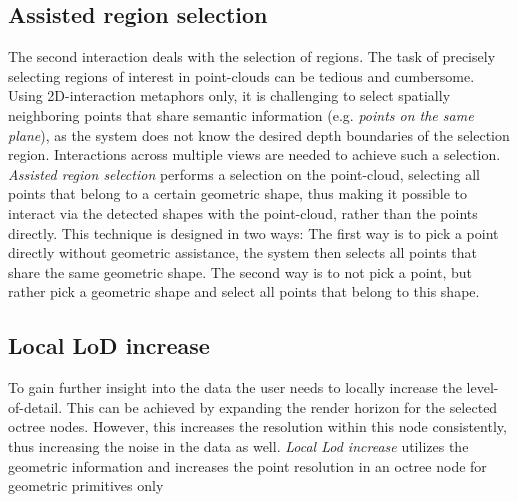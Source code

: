 \subsection{Assisted region selection}
The second interaction deals with the selection of regions. The task of precisely selecting regions of interest in point-clouds can be tedious and cumbersome. Using 2D-interaction metaphors only, it is challenging to select spatially neighboring points that share semantic information (e.g. \textit{points on the same plane}), as the system does not know the desired depth boundaries of the selection region. Interactions across multiple views are needed to achieve such a selection. \textit{Assisted region selection} performs a selection on the point-cloud, selecting all points that belong to a certain geometric shape, thus making it possible to interact via the detected shapes with the point-cloud, rather than the points directly. 
This technique is designed in two ways: 
The first way is to pick a point directly without geometric assistance, the system then selects all points that share the same geometric shape.
The second way is to not pick a point, but rather pick a geometric shape and select all points that belong to this shape. 
\\
\subsection{Local LoD increase}
To gain further insight into the data the user needs to locally increase the level-of-detail. This can be achieved by expanding the render horizon for the selected octree nodes. However, this increases the resolution within this node consistently, thus increasing the noise in the data as well. \textit{Local Lod increase} utilizes the geometric information and increases the  point resolution in an octree node for geometric primitives only
